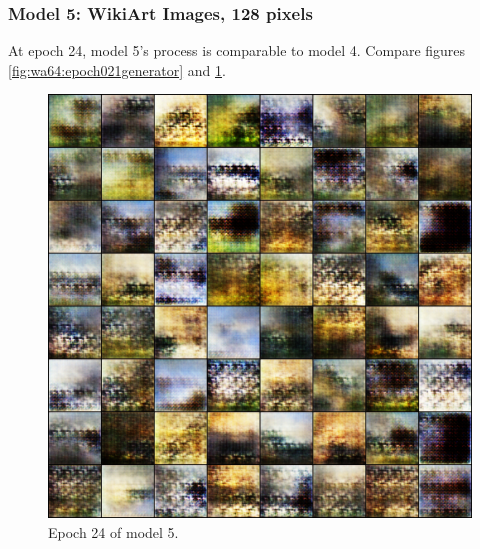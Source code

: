 \documentclass[11pt,letterpaper]{article}
\begin{document}
			\subsubsection{Model 5: WikiArt Images, 128 pixels}
				At epoch 24, model 5's process is comparable to model 4.
				Compare figures \ref{fig:wa64:epoch021generator} and \ref{fig:wa128:epoch024generator}.
				\begin{figure}
					\centering
					\includegraphics[width=1.0\linewidth]{results/model5/epoch024_generator}
					\caption{Epoch 24 of model 5.}
					\label{fig:wa128:epoch024generator}
				\end{figure}
\end{document}
